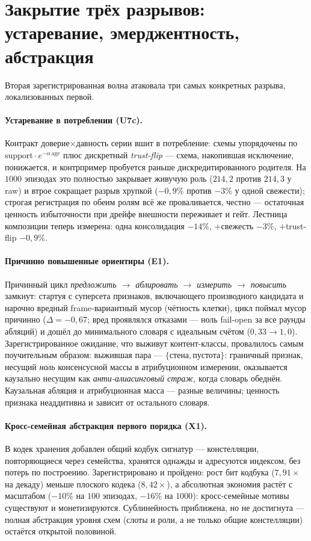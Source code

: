 \documentclass{article}
\begin{document}
\section{Закрытие трёх разрывов: устаревание, эмерджентность, абстракция}
\label{sec:gaps}

Вторая зарегистрированная волна атаковала три самых конкретных
разрыва, локализованных первой.

\paragraph{Устаревание в потреблении (U7c).} Контракт
доверие$\times$давность серии вшит в потребление: схемы упорядочены
по $\text{support}\cdot e^{-\alpha\,\text{age}}$ плюс дискретный
\emph{trust-flip} --- схема, накопившая исключение, понижается, и
контрпример пробуется раньше дискредитированного родителя. На $1000$
эпизодах это полностью закрывает живучую роль ($214{,}2$ против
$214{,}3$ у raw) и втрое сокращает разрыв хрупкой ($-0{,}9\%$ против
$-3\%$ у одной свежести); строгая регистрация по обеим ролям всё же
проваливается, честно --- остаточная ценность избыточности при дрейфе
внешности переживает и гейт. Лестница композиции теперь измерена:
одна консолидация $-14\%$, $+$свежесть $-3\%$, $+$trust-flip
$-0{,}9\%$.

\paragraph{Причинно повышенные ориентиры (E1).} Причинный цикл
\emph{предложить $\to$ аблировать $\to$ измерить $\to$ повысить}
замкнут: стартуя с суперсета признаков, включающего производного
кандидата и нарочно вредный frame-вариантный мусор (чётность клетки),
цикл поймал мусор причинно ($\Delta = -0{,}67$; вред проявлялся
отказами --- ноль fail-open за все раунды абляций) и дошёл до
минимального словаря с идеальным счётом ($0{,}33 \to 1{,}0$).
Зарегистрированное ожидание, что выживут контент-классы, провалилось
самым поучительным образом: выжившая пара --- $\{\texttt{стена},
\texttt{пустота}\}$: граничный признак, несущий \emph{ноль}
консенсусной массы в атрибуционном измерении, оказывается каузально
несущим как \emph{анти-алиасинговый страж}, когда словарь обеднён.
Каузальная абляция и атрибуционная масса --- разные величины;
ценность признака неаддитивна и зависит от остального словаря.

\paragraph{Кросс-семейная абстракция первого порядка (X1).} В кодек
хранения добавлен общий кодбук сигнатур --- констелляции,
повторяющиеся через семейства, хранятся однажды и адресуются
индексом, без потерь по построению. Зарегистрировано и пройдено: рост
бит кодбука ($7{,}91\times$ на декаду) меньше плоского кодека
($8{,}42\times$), а абсолютная экономия растёт с масштабом
($-10\%$ на $100$ эпизодах, $-16\%$ на $1000$): кросс-семейные мотивы
существуют и монетизируются. Сублинейность приближена, но не
достигнута --- полная абстракция уровня схем (слоты и роли, а не
только общие констелляции) остаётся открытой половиной.
\end{document}
